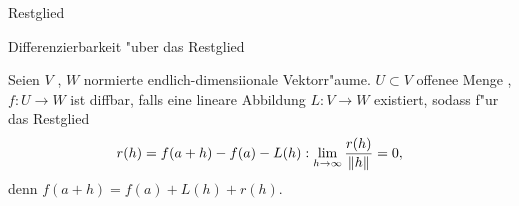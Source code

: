 \documentclass[class=article, crop=false]{standalone}
\begin{document}
\begin{zettel}{Restglied}
\begin{flashcard}[]{}
	\begin{question}
		Differenzierbarkeit "uber das Restglied
	\end{question}
	\begin{definition}
		Seien $V$ , $W$ normierte endlich-dimensiionale Vektorr"aume. $U \subset V$ offenee Menge , $f: U \to W$ ist diffbar, falls eine lineare Abbildung $L: V \to  W$ existiert, sodass f"ur das Restglied
		\[
			r (h)=  f ( a + h ) - f (a)- L (h) : \lim_{h \to \infty} \frac{r (h)}{ \left\|h\right\|} = 0
			,\]
		denn $f (a +h) = f (a) + L (h)+ r (h)$.
	\end{definition}

\end{flashcard}
\end{zettel}
\end{document}
